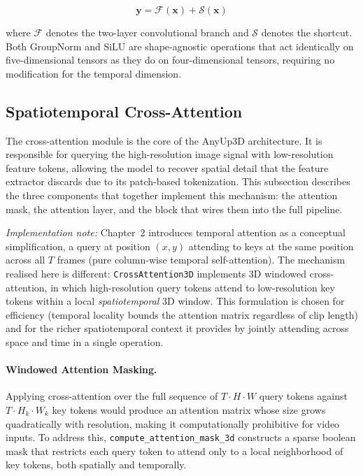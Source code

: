 \begin{equation}
    \mathbf{y} = \mathcal{F}(\mathbf{x}) + \mathcal{S}(\mathbf{x})
\end{equation}

\noindent where $\mathcal{F}$ denotes the two-layer convolutional branch and $\mathcal{S}$ denotes the shortcut. Both GroupNorm and SiLU are shape-agnostic operations that act identically on five-dimensional tensors as they do on four-dimensional tensors, requiring no modification for the temporal dimension.

\subsection{Spatiotemporal Cross-Attention}
\label{sec:crossattn3d}

The cross-attention module is the core of the AnyUp3D architecture. It is responsible for querying the high-resolution image signal with low-resolution feature tokens, allowing the model to recover spatial detail that the feature extractor discards due to its patch-based tokenization. This subsection describes the three components that together implement this mechanism: the attention mask, the attention layer, and the block that wires them into the full pipeline.

\textit{Implementation note:} Chapter~2 introduces temporal attention as a conceptual simplification, a query at position $(x, y)$ attending to keys at the same position across all $T$ frames (pure column-wise temporal self-attention). The mechanism realised here is different: \texttt{CrossAttention3D} implements 3D windowed cross-attention, in which high-resolution query tokens attend to low-resolution key tokens within a local \emph{spatiotemporal} 3D window. This formulation is chosen for efficiency (temporal locality bounds the attention matrix regardless of clip length) and for the richer spatiotemporal context it provides by jointly attending across space and time in a single operation.

\paragraph{Windowed Attention Masking.}
Applying cross-attention over the full sequence of $T \cdot H \cdot W$ query tokens against $T \cdot H_k \cdot W_k$ key tokens would produce an attention matrix whose size grows quadratically with resolution, making it computationally prohibitive for video inputs. To address this, \texttt{compute\_attention\_mask\_3d} constructs a sparse boolean mask that restricts each query token to attend only to a local neighborhood of key tokens, both spatially and temporally.

